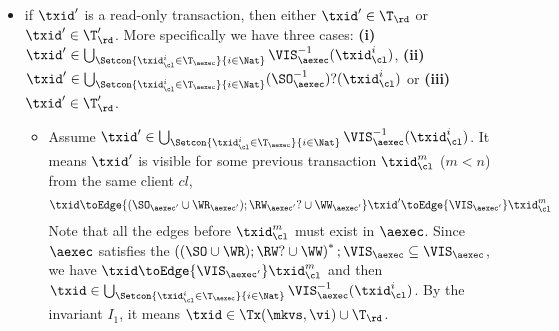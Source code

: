 \begin{itemize}
\begin{itemize}
\begin{itemize}
\begin{equation}
        \label{equ:cp-dagger}
        \dagger  \equiv 
            \fora{\ke, \ke', i, j}
                i \in \vi(\ke)  \wedge \WTx(\hh(\ke', j)) \toEdge{(((\PO \cup \RF_{\hh}) ; \AD_{\hh}?) \cup \VO_{\hh})^{+}} \WTx(\hh(\ke, i))
            \implies j \in \vi(\ke')  
        \end{equation}
        Since \( \WR_\mkvs \), \( \WW_\mkvs \) and \( \RW_\mkvs \) coincide with
        \( \WR_\aexec \), \( \WW_\aexec \) and \( \RW_\aexec \) respectively.
        Also because \( \txid \) write to at least one key,
        it is easy to see there exists some version \( \ke'',m\) such that 
        \( \txid = \WTx(\mkvs(\ke'',m))\) and \( m \in \vi(\ke'')\).
        By definition of \( \Tx \), it follows \( \txid \in \Tx(\mkvs, \vi) \).
        \item if \( \txid \) is a read-only transaction, we add it into \( \T'_\rd \).
    \end{itemize}
    \item 
    if \( \txid' \) is a read-only transaction, then either \( \txid' \in \T_\rd \) or \( \txid' \in \T'_\rd \).
    More specifically we have three cases: \textbf{(i)} \( \txid' \in \bigcup_{\Setcon{\txid_{\cl}^{i} \in \T_{\aexec} }{ i \in \Nat }} \VIS_{\aexec}^{-1}(\txid^i_\cl) \), \textbf{(ii)} \( \txid' \in \bigcup_{\Setcon{\txid_{\cl}^{i} \in \T_{\aexec} }{ i \in \Nat }} (\SO_{\aexec}^{-1})?(\txid^i_\cl) \) or \textbf{(iii)} \( \txid' \in \T'_\rd\).
    \begin{itemize}
        \item
            Assume \( \txid' \in \bigcup_{\Setcon{\txid_{\cl}^{i} \in \T_{\aexec} }{ i \in \Nat }} \VIS_{\aexec}^{-1}(\txid^i_\cl) \).
        It means \( \txid' \) is visible for some previous transaction \( \txid_\cl^m \) (\( m < n \)) from the same client \( cl \), 
        \ie 
        \[ 
            \txid \toEdge{(\SO_{\aexec'} \cup \WR_{\aexec'} ) ; \RW_{\aexec'}? \cup \WW_{\aexec'}} \txid' \toEdge{\VIS_{\aexec'}}  \txid_\cl^m 
        \]
        Note that all the edges before \( \txid_\cl^m \) must exist in \( \aexec \).
        Since \( \aexec \) satisfies the \( \left( (\SO \cup \WR ) ; \RW? \cup \WW \right)^* ; \VIS_\aexec \subseteq \VIS_\aexec \),
        we have \( \txid \toEdge{\VIS_{\aexec'}} \txid_\cl^m \) and then \( \txid \in \bigcup_{\Setcon{\txid_{\cl}^{i} \in \T_{\aexec} }{ i \in \Nat }} \VIS_{\aexec}^{-1}(\txid^i_\cl)\).
        By the invariant \( I_1 \), it means \( \txid \in \Tx(\mkvs, \vi) \cup \T_\rd \).

\end{itemize}
\end{itemize}
\end{itemize}
